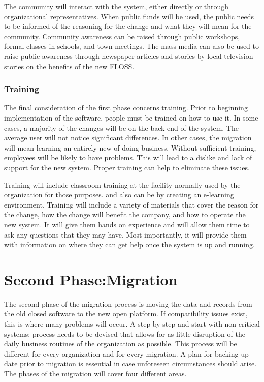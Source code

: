    The community will interact with the system, either directly or through organizational representatives. When public funds will be used, the public needs to be informed of the reasoning for the change and what they will mean for the community. Community awareness can be raised through public workshops, formal classes in schools, and town meetings. The mass media can also be used to raise public awareness through newspaper articles and stories by local television stories on the benefits of the new FLOSS. 
    
    \subsubsection{Training}
    The final consideration of the first phase concerns training. Prior to beginning implementation of the software, people must be trained on how to use it. In some cases, a majority of the changes will be on the back end of the system. The average user will not notice significant differences. In other cases, the migration will mean learning an entirely new of doing business. Without sufficient training, employees will be likely to have problems. This will lead to a dislike and lack of support for the new system. Proper training can help to eliminate these issues. 
    
    Training will include classroom training at the facility normally used by the organization for those purposes. and also can be by creating an e-learning environment. Training will include a variety of materials that cover the reason for the change, how the change will benefit the company, and how to operate the new system. It will give them hands on experience and will allow them time to ask any questions that they may have. Most importantly, it will provide them with information on where they can get help once the system is up and running.
    
    \section{Second Phase:Migration}
    
    The second phase of the migration process is moving the data and records from the old closed software to the new open platform. If compatibility issues exist, this is where many problems will occur.  A step by step and start with non critical systems; process needs to be devised that allows for as little disruption of the daily business routines of the organization as possible. This process will be different for every organization and for every migration. A plan for backing up date prior to migration is essential in case unforeseen circumstances should arise. The phases of the migration will cover four different areas. 
    
